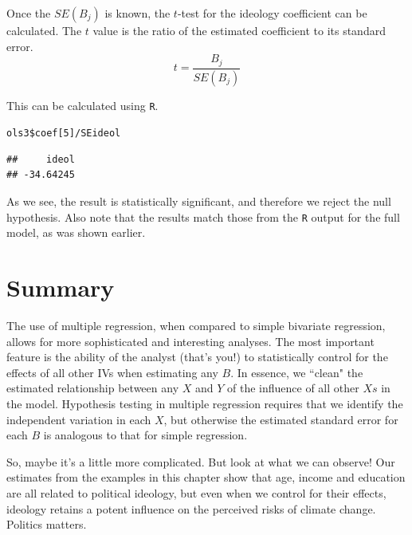 \documentclass[11pt,openany]{book}\usepackage[]{graphicx}\usepackage[]{color}
\makeatletter
\newcommand{\hlnum}[1]{\textcolor[rgb]{0.686,0.059,0.569}{#1}}%
\newcommand{\hlopt}[1]{\textcolor[rgb]{0,0,0}{#1}}%
\newcommand{\hlstd}[1]{\textcolor[rgb]{0.345,0.345,0.345}{#1}}%
\newenvironment{kframe}{%
 \def\at@end@of@kframe{}%
 \ifinner\ifhmode%
  \def\at@end@of@kframe{\end{minipage}}%
  \begin{minipage}{\columnwidth}%
 \fi\fi%
 \def\FrameCommand##1{\hskip\@totalleftmargin \hskip-\fboxsep
 \colorbox{shadecolor}{##1}\hskip-\fboxsep
     \hskip-\linewidth \hskip-\@totalleftmargin \hskip\columnwidth}%
 \MakeFramed {\advance\hsize-\width
   \@totalleftmargin\z@ \linewidth\hsize
   \@setminipage}}%
 {\par\unskip\endMakeFramed%
 \at@end@of@kframe}
\newenvironment{knitrout}{}{} %
\renewenvironment{knitrout}{\begin{singlespace}}{\end{singlespace}}
\makeatother
\begin{document}
Once the $SE(B_j)$ is known, the $t$-test for the ideology coefficient
can be calculated. The $t$ value is the ratio of the estimated
coefficient to its standard error. 
\begin{equation}
  t = \frac{B_j}{SE(B_j)}
\end{equation}

This can be calculated using \texttt{R}. 
\begin{knitrout}
\color{fgcolor}\begin{kframe}
\begin{alltt}
\hlstd{ols3}\hlopt{\$}\hlstd{coef[}\hlnum{5}\hlstd{]}\hlopt{/}\hlstd{SEideol}
\end{alltt}
\begin{verbatim}
##     ideol 
## -34.64245
\end{verbatim}
\end{kframe}
\end{knitrout}

As we see, the result is statistically significant, and therefore we reject the null hypothesis.  Also note that the results match those from the \texttt{R} output for the full model, as was shown earlier.

\section{Summary}
The use of multiple regression, when compared to simple bivariate regression, allows for more sophisticated and interesting analyses. The most important feature is the ability of the analyst (that's you!) to statistically control for the effects of all other IVs when estimating any $B$.
In essence, we ``clean" the estimated relationship between any $X$ and $Y$ of the influence of all  other $Xs$ in the model. Hypothesis testing in multiple regression requires that we identify the independent variation in each $X$, but otherwise the estimated standard error for each $B$ is analogous to that for simple regression.

So, maybe it's a little more complicated. But look at what we can observe! Our estimates from the examples in this chapter show that age, income and education are all related to political ideology, but even when we control for their effects, ideology retains a potent influence on the perceived
risks of climate change. Politics matters.
\end{document}
